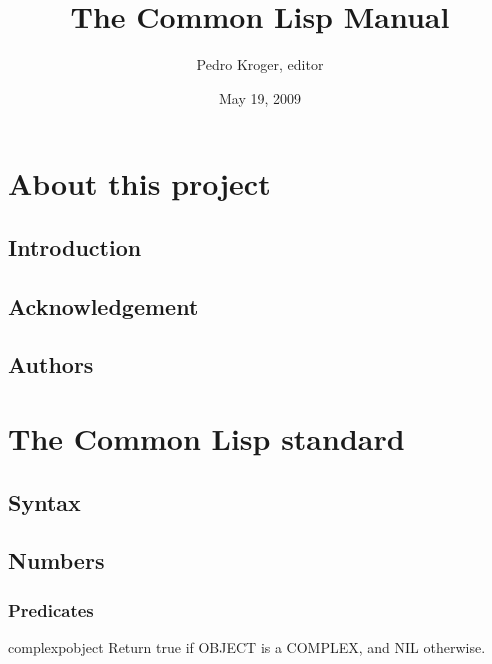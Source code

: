 \documentclass[10pt,english]{book}
\title{The Common Lisp Manual}
\author{Pedro Kroger, editor}
\date{May 19, 2009}
\begin{document}
\frontmatter

\maketitle
\tableofcontents

\mainmatter

\part{About this project}
\label{part:about-this-project}

\chapter{Introduction}
\label{cha:introduction}



\chapter{Acknowledgement}
\label{cha:acknowledgement}



\chapter{Authors}
\label{cha:authors}



\part{The Common Lisp standard}
\label{part:common-lisp-standard}

\chapter{Syntax}
\label{cha:syntax}


\chapter{Numbers}

\section{Predicates}
\label{sec:number-predicates}

\begin{function}{complexp}{object}
  Return true if OBJECT is a COMPLEX, and NIL otherwise.
\end{function}
\end{document}
